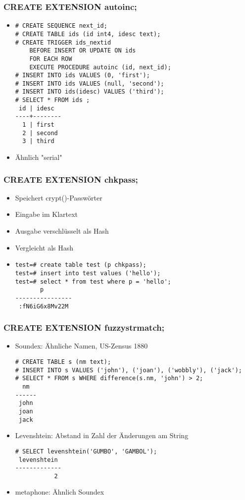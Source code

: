 \documentclass[utf8,hyperref={pdftex,colorlinks,linkcolor=black,citecolor=black,urlcolor=black,filecolor=black,plainpages=false},xcolor=table,hyperref]{beamer}
\begin{document}
\begin{frame}[containsverbatim]
	\frametitle{CREATE EXTENSION autoinc;}
	\begin{itemize}
		\item 
	\begin{verbatim}
# CREATE SEQUENCE next_id;
# CREATE TABLE ids (id int4, idesc text);
# CREATE TRIGGER ids_nextid
    BEFORE INSERT OR UPDATE ON ids
    FOR EACH ROW
    EXECUTE PROCEDURE autoinc (id, next_id);
# INSERT INTO ids VALUES (0, 'first');
# INSERT INTO ids VALUES (null, 'second');
# INSERT INTO ids(idesc) VALUES ('third');
# SELECT * FROM ids ;
 id | idesc  
----+--------
  1 | first
  2 | second
  3 | third
\end{verbatim}
\item Ähnlich "{}serial"
	\end{itemize}
\end{frame}

\begin{frame}[containsverbatim]
	\frametitle{CREATE EXTENSION chkpass;}
	\begin{itemize}
		\item Speichert crypt()-Passwörter
		\item Eingabe im Klartext
		\item Ausgabe verschlüsselt als Hash
		\item Vergleicht als Hash
		\item 
			\begin{verbatim}
test=# create table test (p chkpass);
test=# insert into test values ('hello');
test=# select * from test where p = 'hello';
       p        
----------------
 :fN6iG6x8Mv22M
 \end{verbatim}
 \end{itemize}
\end{frame}

\begin{frame}[containsverbatim]
	\frametitle{CREATE EXTENSION fuzzystrmatch;}
	\begin{itemize}
		\item Soundex: Ähnliche Namen, US-Zensus 1880
			{\footnotesize
		\begin{verbatim}
# CREATE TABLE s (nm text);
# INSERT INTO s VALUES ('john'), ('joan'), ('wobbly'), ('jack');
# SELECT * FROM s WHERE difference(s.nm, 'john') > 2;
  nm  
------
 john
 joan
 jack
			  \end{verbatim}}
		  \item Levenshtein: Abstand in Zahl der Änderungen am String
			  {\footnotesize
			  \begin{verbatim}
# SELECT levenshtein('GUMBO', 'GAMBOL');
 levenshtein
-------------
           2
	   \end{verbatim}}
   \item metaphone: Ähnlich Soundex
	  \end{itemize}

\end{frame}
\end{document}
